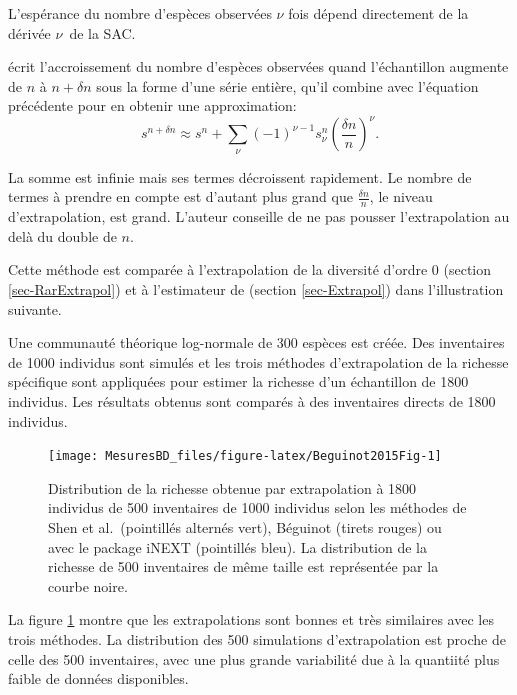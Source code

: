 \documentclass[
  11pt,
  french,
  a4paper,
  extrafontsizes,onecolumn,openright
  ]{memoir}
\begin{document}
L'espérance du nombre d'espèces observées \(\nu\) fois dépend directement de la dérivée \(\nu\)\ieme~de la SAC.

\textcite{Beguinot2015} écrit l'accroissement du nombre d'espèces observées quand l'échantillon augmente de \(n\) à \(n +\delta n\) sous la forme d'une série entière, qu'il combine avec l'équation précédente pour en obtenir une approximation:
\begin{equation}
  s^{n +\delta n}
  \approx s^{n} + \sum_\nu {\left(-1 \right)^{\nu-1} s^{n}_{\nu} \left(\frac{\delta n}{n}\right)^{\nu}}.
\end{equation}

La somme est infinie mais ses termes décroissent rapidement.
Le nombre de termes à prendre en compte est d'autant plus grand que \(\frac{\delta n}{n}\), le niveau d'extrapolation, est grand.
L'auteur conseille de ne pas pousser l'extrapolation au delà du double de \(n\).

Cette méthode est comparée à l'extrapolation de la diversité d'ordre 0 (section \ref{sec-RarExtrapol}) et à l'estimateur de \textcite{Shen2003} (section \ref{sec-Extrapol}) dans l'illustration suivante.

Une communauté théorique log-normale de 300 espèces est créée.
Des inventaires de 1000 individus sont simulés et les trois méthodes d'extrapolation de la richesse spécifique sont appliquées pour estimer la richesse d'un échantillon de 1800 individus.
Les résultats obtenus sont comparés à des inventaires directs de 1800 individus.



\scriptsize

\begin{figure}

{\centering \texttt{[image: MesuresBD\_files/figure-latex/Beguinot2015Fig-1]} 

}

\caption{Distribution de la richesse obtenue par extrapolation à 1800 individus de 500 inventaires de 1000 individus selon les méthodes de Shen et al.~(pointillés alternés vert), Béguinot (tirets rouges) ou avec le package iNEXT (pointillés bleu). La distribution de la richesse de 500 inventaires de même taille est représentée par la courbe noire.}\label{fig:Beguinot2015Fig}
\end{figure}

\normalsize

La figure \ref{fig:Beguinot2015Fig} montre que les extrapolations sont bonnes et très similaires avec les trois méthodes.
La distribution des 500 simulations d'extrapolation est proche de celle des 500 inventaires, avec une plus grande variabilité due à la quantiité plus faible de données disponibles.
\end{document}
